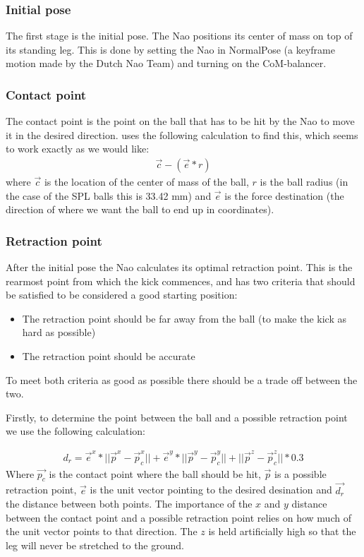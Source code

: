\documentclass[a4paper]{article}
\begin{document}
\subsubsection{Initial pose}
The first stage is the initial pose. The Nao positions its center of mass on
top of its standing leg. This is done by setting the Nao in NormalPose (a
keyframe motion made by the Dutch Nao Team) and
turning on the CoM-balancer.

\subsubsection{Contact point}
The contact point is the point on the ball that has to be hit by the Nao to
move it in the desired direction. \cite{Xu2010} uses the following
calculation to find this, which seems to work exactly as we would like:
\begin{align*}
    \vec{c} - ( \vec{e} * r )
\end{align*}
where $\vec{c}$ is the location of the center of mass of the ball, $r$ is the
ball radius (in the case of the SPL balls this is 33.42 mm) and $\vec{e}$ is the
force destination (the direction of where we want the ball to end up in
coordinates). 


\subsubsection{Retraction point}
After the initial pose the Nao calculates its optimal retraction point. This
is the rearmost point from which the kick commences, and has two criteria that
should be satisfied to be considered a good starting position:
\begin{itemize}
    \item The retraction point should be far away from the ball (to make the
        kick as hard as possible)
    \item The retraction point should be accurate 
\end{itemize}
To meet both criteria as good as possible there should be a trade off between
the two.

Firstly, to determine the point between the ball and a possible retraction point
we use the following calculation: 

\begin{align}
    d_r = \vec{e}^{x} * || \vec{p}^{x} -\vec{p}_{c}^{x}|| + \vec{e}^y *
||\vec{p}^{y} - \vec{p}_{c}^y|| +  ||
\vec{p}^z - \vec{p}_{c}^z|| * 0.3
\label{eq:distance}
\end{align}
Where $\vec{p_c}$ is the contact point where the ball should be hit,
$\vec{p}$ is a possible retraction point, $\vec{e}$ is the unit vector pointing
to the desired desination and $\vec{d_r}$ the distance between both
points. The importance of the $x$ and $y$ distance between the contact point and a possible
retraction point relies on how much of the unit vector points to that direction.
The $z$ is held artificially high so that the leg will never be stretched to the
ground.
\end{document}
